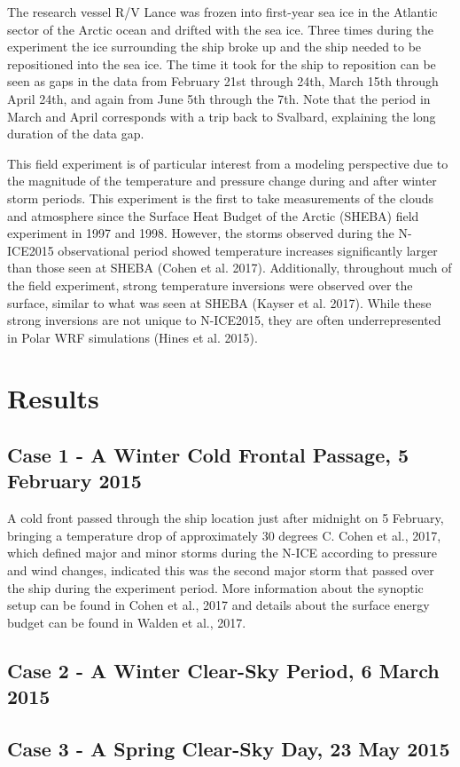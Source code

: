  The research vessel R/V Lance was frozen into first-year sea ice in the Atlantic sector of the Arctic ocean and drifted with the sea ice. Three times during the experiment the ice surrounding the ship broke up and the ship needed to be repositioned into the sea ice. The time it took for the ship to reposition can be seen as gaps in the data from February 21st through 24th, March 15th through April 24th, and again from June 5th through the 7th. Note that the period in March and April corresponds with a trip back to Svalbard, explaining the long duration of the data gap.

This field experiment is of particular interest from a modeling perspective due to the magnitude of the temperature and pressure change during and after winter storm periods. This experiment is the first to take measurements of the clouds and atmosphere since the Surface Heat Budget of the Arctic (SHEBA) field experiment in 1997 and 1998. However, the storms observed during the N-ICE2015 observational period showed temperature increases significantly larger than those seen at SHEBA (Cohen et al. 2017). Additionally, throughout much of the field experiment, strong temperature inversions were observed over the surface, similar to what was seen at SHEBA (Kayser et al. 2017). While these strong inversions are not unique to N-ICE2015, they are often underrepresented in Polar WRF simulations (Hines et al. 2015).

\section{Results}
\subsection{Case 1 - A Winter Cold Frontal Passage, 5 February 2015}

A cold front passed through the ship location just after midnight on 5 February, bringing a temperature drop of approximately 30 degrees C. Cohen et al., 2017, which defined major and minor storms during the N-ICE according to pressure and wind changes, indicated this was the second major storm that passed over the ship during the experiment period. More information about the synoptic setup can be found in Cohen et al., 2017 and details about the surface energy budget can be found in Walden et al., 2017. 

\subsection{Case 2 - A Winter Clear-Sky Period, 6 March 2015}

\subsection{Case 3 - A Spring Clear-Sky Day, 23 May 2015}
